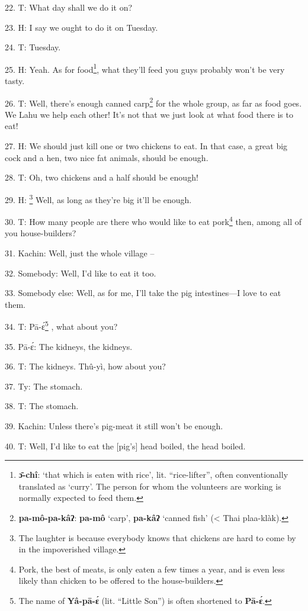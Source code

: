 22. T: What day shall we do it on?

23. H: I say we ought to do it on Tuesday.

24. T: Tuesday.

25. H: Yeah. As for food\footnote{\textbf{ɔ̄-chî}: `that which is eaten with rice', lit. ``rice-lifter'', often conventionally translated as `curry'. The person for whom the volunteers are working is normally expected to feed them.}, what they'll feed you guys probably won't be very
tasty.

26. T: Well, there's enough canned carp\footnote{\textbf{pa-mô-pa-kâʔ}: \textbf{pa-mô} `carp', \textbf{pa-kâʔ} `canned fish' (< Thai plaa-klàk).} for the whole group, as far as food
goes. We Lahu we help each other! It's not that we just look at what food there
is to eat!

27. H: We should just kill one or two chickens to eat. In that case, a great big
cock and a hen, two nice fat animals, should be enough.

28. T: Oh, two chickens and a half should be enough!

29. H: \footnote{The laughter is because everybody knows that chickens are hard to come by in the impoverished village.} Well, as long as they're big it'll be enough.

30. T: How many people are there who would like to eat pork\footnote{Pork, the best of meats, is only eaten a few times a year, and is even less likely than chicken to be offered to the house-builders.} then, among all
of you house-builders?

31. Kachin: Well, just the whole village --

32. Somebody: Well, I'd like to eat it too.

33. Somebody else: Well, as for me, I'll take the pig intestines---I love to eat
them.

34. T: Pā-ɛ́\footnote{The name of \textbf{Yâ-pā-ɛ́} (lit. ``Little Son'') is often shortened to \textbf{Pā-ɛ́}.} , what about you?

35. Pā-ɛ́: The kidneys, the kidneys.

36. T: The kidneys. Thû-yì, how about you?

37. Ty: The stomach.

38. T: The stomach.

39. Kachin: Unless there's pig-meat it still won't be enough.

40. T: Well, I'd like to eat the [pig's] head boiled, the head boiled.

